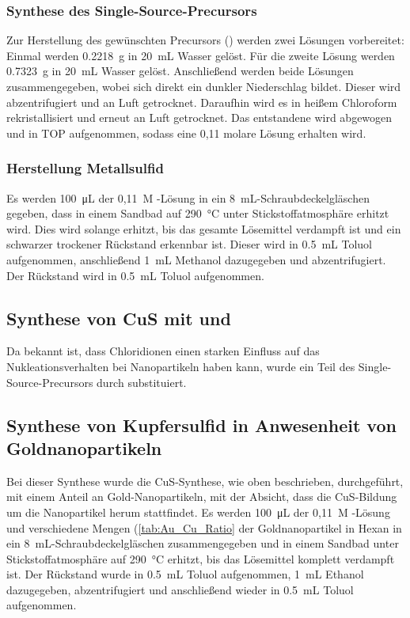 	\subsubsection{Synthese des Single-Source-Precursors }
	Zur Herstellung des gewünschten Precursors () werden zwei Lösungen vorbereitet: 
	Einmal werden \SI{0,2218}{\gram}  in \SI{20}{\milli\liter} Wasser gelöst.
	Für die zweite Lösung werden \SI{0,7323}{\gram}  in \SI{20}{\milli\liter} Wasser gelöst.
	Anschließend werden beide Lösungen zusammengegeben, wobei sich direkt ein dunkler Niederschlag bildet.
	Dieser wird abzentrifugiert und an Luft getrocknet.
	Daraufhin wird es in heißem Chloroform rekristallisiert und erneut an Luft getrocknet.
	Das entstandene  wird abgewogen und in TOP aufgenommen, sodass eine 0,11 molare Lösung erhalten wird.
	
	\subsubsection{Herstellung Metallsulfid}
	Es werden \SI{100}{\micro\liter} der 0,11~M -Lösung in ein \SI{8}{\milli\liter}-Schraubdeckelgläschen gegeben, dass in einem Sandbad auf \SI{290}{\degreeCelsius} unter Stickstoffatmosphäre erhitzt wird.
	Dies wird solange erhitzt, bis das gesamte Lösemittel verdampft ist und ein schwarzer trockener Rückstand erkennbar ist.
	Dieser wird in \SI{0,5}{\milli\liter} Toluol aufgenommen, anschließend \SI{1}{\milli\liter} Methanol dazugegeben und abzentrifugiert.
	Der Rückstand wird in \SI{0,5}{\milli\liter} Toluol aufgenommen.
	
	\subsection{Synthese von CuS mit  und }
	Da bekannt ist, dass Chloridionen einen starken Einfluss auf das Nukleationsverhalten bei Nanopartikeln haben kann\cite{Hinrichs2016}, wurde ein Teil des Single-Source-Precursors durch  substituiert.
	
	\subsection{Synthese von Kupfersulfid in Anwesenheit von Goldnanopartikeln}
	
	Bei dieser Synthese wurde die CuS-Synthese, wie oben beschrieben, durchgeführt, mit einem Anteil an Gold-Nanopartikeln, mit der Absicht, dass die CuS-Bildung um die Nanopartikel herum stattfindet.	
	Es werden \SI{100}{\micro\liter} der 0,11~M -Lösung und verschiedene Mengen (\cref{tab:Au_Cu_Ratio} der Goldnanopartikel in Hexan in ein \SI{8}{\milli\liter}-Schraubdeckelgläschen zusammengegeben und in einem Sandbad unter Stickstoffatmosphäre auf \SI{290}{\degreeCelsius} erhitzt, bis das Lösemittel komplett verdampft ist.
	Der Rückstand wurde in \SI{0,5}{\milli\liter} Toluol aufgenommen, \SI{1}{\milli\liter} Ethanol dazugegeben, abzentrifugiert und anschließend wieder in \SI{0,5}{\milli\liter} Toluol aufgenommen.
	
